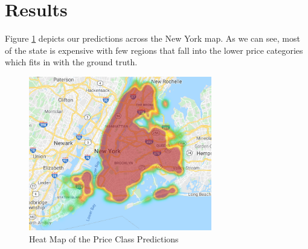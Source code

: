 \documentclass{sig-alternate}
\begin{document}
	\section{Results}
	Figure \ref{nyheatmap} depicts our predictions across the New York map. As we can see, most of the state is expensive with few regions that fall into the lower price categories which fits in with the ground truth.\\ 
	\begin{figure}[ht]
		\includegraphics[width=8cm]{heatmap.png}
		\caption{Heat Map of the Price Class Predictions}
		\label{nyheatmap}
		\centering
	\end{figure}	
\end{document}
